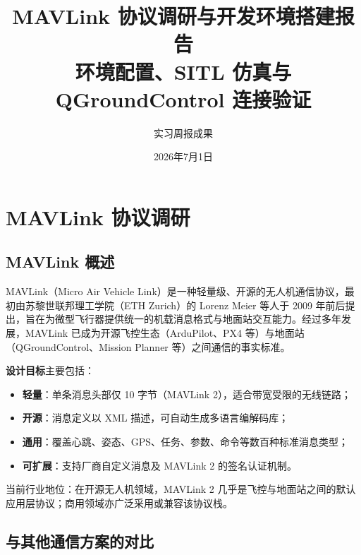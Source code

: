 \documentclass[12pt,a4paper]{article}
\title{\textbf{MAVLink 协议调研与开发环境搭建报告} \\ \large 环境配置、SITL 仿真与 QGroundControl 连接验证}
\author{实习周报成果}
\date{2026年7月1日}
\begin{document}
\maketitle
\tableofcontents
\newpage

\section{MAVLink 协议调研}

\subsection{MAVLink 概述}

MAVLink（Micro Air Vehicle Link）是一种轻量级、开源的无人机通信协议，最初由苏黎世联邦理工学院（ETH Zurich）的 Lorenz Meier 等人于 2009 年前后提出，旨在为微型飞行器提供统一的机载消息格式与地面站交互能力。经过多年发展，MAVLink 已成为开源飞控生态（ArduPilot、PX4 等）与地面站（QGroundControl、Mission Planner 等）之间通信的事实标准。

\textbf{设计目标}主要包括：
\begin{itemize}[leftmargin=2em]
    \item \textbf{轻量}：单条消息头部仅 10 字节（MAVLink 2），适合带宽受限的无线链路；
    \item \textbf{开源}：消息定义以 XML 描述，可自动生成多语言编解码库；
    \item \textbf{通用}：覆盖心跳、姿态、GPS、任务、参数、命令等数百种标准消息类型；
    \item \textbf{可扩展}：支持厂商自定义消息及 MAVLink 2 的签名认证机制。
\end{itemize}

当前行业地位：在开源无人机领域，MAVLink 2 几乎是飞控与地面站之间的默认应用层协议；商用领域亦广泛采用或兼容该协议栈。

\subsection{与其他通信方案的对比}
\end{document}
